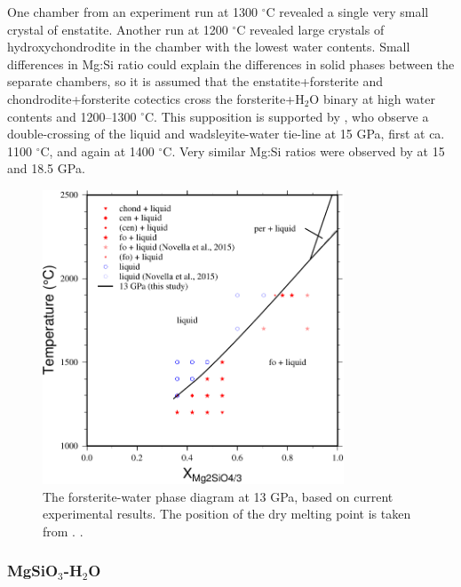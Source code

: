 \documentclass[review]{elsarticle}
\begin{document}
One chamber from an experiment run at 1300 $^{\circ}$C revealed a single very small crystal of enstatite. Another run at 1200 $^{\circ}$C revealed large crystals of hydroxychondrodite in the chamber with the lowest water contents. Small differences in Mg:Si ratio could explain the differences in solid phases between the separate chambers, so it is assumed that the enstatite+forsterite and chondrodite+forsterite cotectics cross the forsterite+H$_2$O binary at high water contents and 1200--1300 $^{\circ}$C. This supposition is supported by \cite{DDFK2005}, who observe a double-crossing of the liquid and wadsleyite-water tie-line at 15 GPa, first at ca. 1100 $^{\circ}$C, and again at 1400 $^{\circ}$C. Very similar Mg:Si ratios were observed by \citep{LSOK2011} at 15 and 18.5 GPa.

\begin{figure}[ht!]
  \centering
      \includegraphics[width=0.8\textwidth]{figures/fo-H2O}
  \caption{The forsterite-water phase diagram at 13 GPa, based on current experimental results. The position of the dry melting point is taken from \citep{PW1993}. \citep{LF2012}.}
  \label{fig:foH}
\end{figure}
\clearpage
\subsubsection{MgSiO$_3$-H$_2$O}
\end{document}
